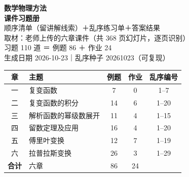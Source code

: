 \documentclass[10.5pt]{ctexart}
\begin{document}
\thispagestyle{empty}
\begin{center}
\vspace*{1.0cm}
{\color{deepblue}\Huge\bfseries 数学物理方法}
\\[4pt]
{\color{deepblue}\Huge\bfseries 课件习题册}
\\[10pt]
{\large 顺序清单（留讲解线索）\quad＋\quad 乱序练习单\quad＋\quad 答案结果}
\\[12pt]
{\small 取材：老师上传的六章课件（共 368 页幻灯片，逐页识别）}
\\[2pt]
{\small 习题 110 道 ＝ 例题 86 ＋ 作业 24}
\\[2pt]
{\small 生成日期 2026-10-23\quad｜\quad 乱序种子 20261023（可复现）}
\end{center}
\vspace{0.5cm}
\begin{center}\renewcommand{\arraystretch}{1.28}\small
\begin{tabular}{|c|>{\raggedright\arraybackslash}p{7.6cm}|c|c|c|}\hline
\textbf{章} & \textbf{主题} & \textbf{例题} & \textbf{作业} & \textbf{乱序编号}\\\hline
一 & 复变函数 & 7 & 0 & 1--7\\
\hline
二 & 复变函数的积分 & 14 & 6 & 1--20\\
\hline
三 & 解析函数的幂级数展开 & 11 & 4 & 1--15\\
\hline
四 & 留数定理及应用 & 16 & 4 & 1--20\\
\hline
五 & 傅里叶变换 & 12 & 7 & 1--19\\
\hline
六 & 拉普拉斯变换 & 26 & 3 & 1--29\\
\hline
\textbf{合计} & 六章 & 86 & 24 & \\\hline
\end{tabular}\end{center}
\end{document}
